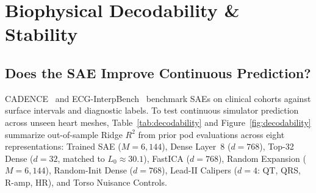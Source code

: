 \documentclass[10pt,twocolumn,letterpaper]{article}
\begin{document}
\section{Biophysical Decodability \& Stability}

\subsection{Does the SAE Improve Continuous Prediction?}
CADENCE~\cite{duan2026cadence} and ECG-InterpBench~\cite{duan2026ecginterpbench} benchmark SAEs on clinical cohorts against surface intervals and diagnostic labels. To test continuous simulator prediction across unseen heart meshes, Table~\ref{tab:decodability} and Figure~\ref{fig:decodability} summarize out-of-sample Ridge $R^2$ from prior pod evaluations across eight representations: Trained SAE ($M=6{,}144$), Dense Layer~8 ($d=768$), Top-32 Dense ($d=32$, matched to $L_0 \approx 30.1$), FastICA ($d=768$), Random Expansion ($M=6{,}144$), Random-Init Dense ($d=768$), Lead-II Calipers ($d=4$: QT, QRS, R-amp, HR), and Torso Nuisance Controls.

\begin{table}[t]
\centering
\caption{\textbf{Biophysical Decodability Benchmark ($R^2$ on Unseen Test Heart Meshes).} Out-of-sample Ridge $R^2$ from prior pod evaluations. Bootstrap 95\% CIs are cluster-resampled over $G_{\text{test}}$ test heart meshes ($^*$record-level bootstrap on $n=600$ ECGs for single-test-mesh $v_{\text{isch}[0].z}$).}
\label{tab:decodability}
\vspace{2pt}
\end{table}
\end{document}
